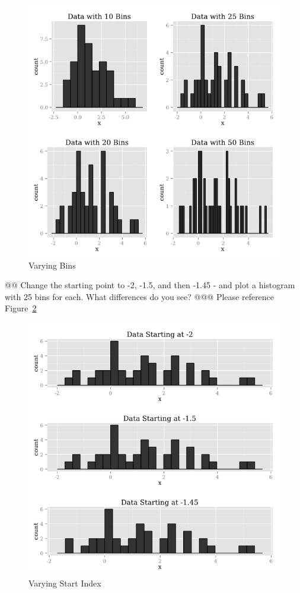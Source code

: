 \documentclass[10pt]{article}
\begin{document}
\begin{easylist}[enumerate]
\begin{figure}[!ht]
            \includegraphics[scale=0.5]{./img/5b.png}
            \caption{Varying Bins}
            \label{fig:bins}
        \end{figure}
    @@ Change the starting point to -2, -1.5, and then -1.45 - and plot a histogram with 25 bins for each.  What differences do you see?
    @@@ Please reference Figure~\ref{fig:index}
        \begin{figure}[!ht]
            \centering
            \includegraphics[scale=0.5]{./img/5c.png}
            \caption{Varying Start Index}
            \label{fig:index}
        \end{figure}
\end{easylist}
\end{document}
